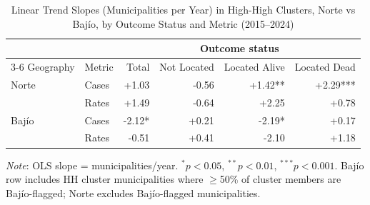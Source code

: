 \begin{table}[htbp]
\centering
\small
\caption{Linear Trend Slopes (Municipalities per Year) in High-High Clusters, Norte vs Bajío, by Outcome Status and Metric (2015--2024)}
\label{tab:trend_slopes}
\begin{tabular}{llrrrr}
\toprule
 & & \multicolumn{4}{c}{Outcome status} \\
\cmidrule(lr){3-6}
Geography & Metric & Total & Not Located & Located Alive & Located Dead \\
\midrule
Norte & Cases & +1.03 & -0.56 & +1.42** & +2.29*** \\
 & Rates & +1.49 & -0.64 & +2.25 & +0.78 \\
\midrule
Bajío & Cases & -2.12* & +0.21 & -2.19* & +0.17 \\
 & Rates & -0.51 & +0.41 & -2.10 & +1.18 \\
\bottomrule
\end{tabular}
\par\vspace{4pt}
\begin{minipage}{\textwidth}\footnotesize\textit{Note}: OLS slope = municipalities/year. $^{*}p<0.05$, $^{**}p<0.01$, $^{***}p<0.001$. Baj\'io row includes HH cluster municipalities where $\geq$50\% of cluster members are Baj\'io-flagged; Norte excludes Baj\'io-flagged municipalities.\end{minipage}
\end{table}